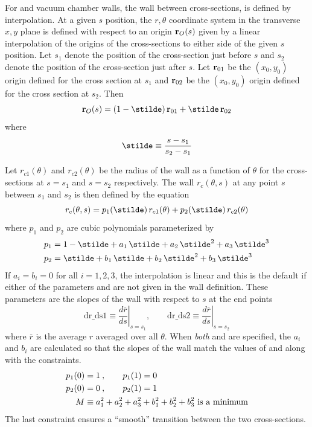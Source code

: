 For  and vacuum chamber walls, the wall between cross-sections, is defined by
interpolation. At a given $s$ position, the $r, \theta$ coordinate system in the transverse $x, y$
plane is defined with respect to an origin ${\bf r}_O(s)$ given by a linear interpolation of the
origins of the cross-sections to either side of the given $s$ position. Let $s_1$ denote the
position of the cross-section just before $s$ and $s_2$ denote the position of the cross-section
just after $s$. Let ${\bf r}_{01}$ be the $(x_0, y_0)$ origin defined for the cross section at $s_1$
and ${\bf r}_{02}$ be the $(x_0, y_0)$ origin defined for the cross section at $s_2$. Then
\begin{equation}
  \bfr_O(s) = (1 - \stilde) \, \bfr_{01} + \stilde \, \bfr_{02}
\end{equation}
where 
\begin{equation}
  \stilde \equiv \frac{s - s_1}{s_2 - s_1}
\end{equation}

Let $r_{c1}(\theta)$ and $r_{c2}(\theta)$ be the radius of the wall as a function of $\theta$ for
the cross-sections at $s = s_1$ and $s = s_2$ respectively. The wall $r_c(\theta, s)$ at any point
$s$ between $s_1$ and $s_2$ is then defined by the equation
\begin{equation}
  r_c(\theta, s) = p_1(\stilde) \, r_{c1}(\theta) + p_2(\stilde) \, r_{c2}(\theta)
\end{equation}
where $p_1$ and $p_2$ are cubic polynomials parameterized by
\begin{align}
  p_1 &= 1 - \stilde + a_1 \, \stilde + a_2 \, \stilde^2 + a_3 \, \stilde^3 \CRNO
  p_2 &= \stilde + b_1 \, \stilde + b_2 \, \stilde^2 + b_3 \, \stilde^3 
\end{align}
If $a_i = b_i = 0$ for all $i = 1, 2, 3$, the interpolation is linear and this is the default if
either of the parameters  and  are not given in the wall definition. These
parameters are the slopes of the wall with respect to $s$ at the end points
\begin{equation}
  \text{dr_ds1} \equiv \left. \frac{d\overline{r}}{ds} \right|_{s = s_1} \comma \qquad
  \text{dr_ds2} \equiv \left. \frac{d\overline{r}}{ds} \right|_{s = s_2} 
\end{equation}
where $\overline{r}$ is the average $r$ averaged over all $\theta$. When {\em both}  and
 are specified, the $a_i$ and $b_i$ are calculated so that the slopes of the wall match
the values of  and  along with the constraints.
\begin{align}
  p_1(0) &= 1 \> , \qquad p_1(1) = 0 \nonumber \\
  p_2(0) &= 0 \> , \qquad p_2(1) = 1 \\
  M &\equiv a_1^2 + a_2^2 + a_3^2 + b_1^2 + b_2^2 + b_3^2 \text{ is a minimum}
  \nonumber
\end{align}
The last constraint ensures a ``smooth'' transition between the two cross-sections.

